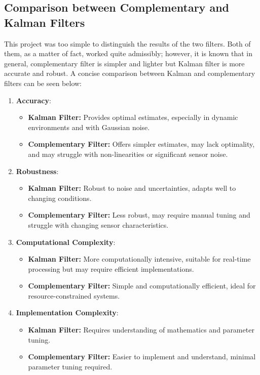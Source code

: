 \documentclass[conference]{IEEEtran}
\begin{document}
\subsection{Comparison between Complementary and Kalman Filters}
This project was too simple to distinguish the results of the two filters. Both of them, as a matter of fact, worked quite admissibly; however, it is known that in general, complementary filter is simpler and lighter but Kalman filter is more accurate and robust. A concise comparison between Kalman and complementary filters can be seen below:
\begin{enumerate}
    \item \textbf{Accuracy}:
          \begin{itemize}
              \item \textbf{Kalman Filter:} Provides optimal estimates, especially in dynamic environments and with Gaussian noise.
              \item \textbf{Complementary Filter:} Offers simpler estimates, may lack optimality, and may struggle with non-linearities or significant sensor noise.
          \end{itemize}

    \item \textbf{Robustness}:
          \begin{itemize}
              \item \textbf{Kalman Filter:} Robust to noise and uncertainties, adapts well to changing conditions.
              \item \textbf{Complementary Filter:} Less robust, may require manual tuning and struggle with changing sensor characteristics.
          \end{itemize}

    \item \textbf{Computational Complexity}:
          \begin{itemize}
              \item \textbf{Kalman Filter:} More computationally intensive, suitable for real-time processing but may require efficient implementations.
              \item \textbf{Complementary Filter:} Simple and computationally efficient, ideal for resource-constrained systems.
          \end{itemize}

    \item \textbf{Implementation Complexity}:
          \begin{itemize}
              \item \textbf{Kalman Filter:} Requires understanding of mathematics and parameter tuning.
              \item \textbf{Complementary Filter:} Easier to implement and understand, minimal parameter tuning required.
          \end{itemize}


\end{enumerate}
\end{document}
